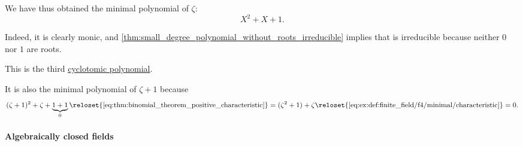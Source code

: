 \begin{example}
\begin{thmenum}
    We have thus obtained the minimal polynomial of \( \zeta \):
    \begin{equation}\label{eq:ex:def:finite_field/f4/minimal}
      X^2 + X + 1.
    \end{equation}

    Indeed, it is clearly monic, and \cref{thm:small_degree_polynomial_without_roots_irreducible} implies that is irreducible because neither \( 0 \) nor \( 1 \) are roots.

    This is the third \hyperref[def:cyclotomic_polynomial]{cyclotomic polynomial}.

    It is also the minimal polynomial of \( \zeta + 1 \) because
    \begin{equation*}
      (\zeta + 1)^2 + \zeta + \underbrace{1 + 1}_0
      \reloset {\eqref{eq:thm:binomial_theorem_positive_characteristic}} =
      (\zeta^2 + 1) + \zeta
      \reloset {\eqref{eq:ex:def:finite_field/f4/minimal/characteristic}} =
      0.
    \end{equation*}
  \end{thmenum}
\end{example}

\paragraph{Algebraically closed fields}


